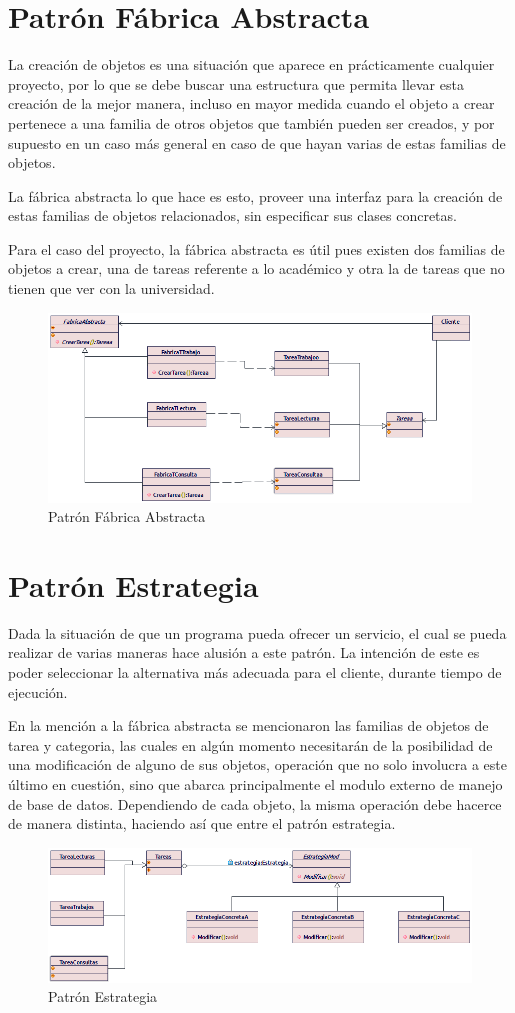 \section{Patrón Fábrica Abstracta}
La creación de objetos es una situación que aparece en prácticamente cualquier proyecto, por lo que se debe buscar una estructura que permita llevar esta creación de la mejor manera, incluso en mayor medida cuando el objeto a crear pertenece a una familia de otros objetos que también pueden ser creados, y por supuesto en un caso más general en caso de que hayan varias de estas familias de objetos.

La fábrica abstracta lo que hace es esto, proveer una interfaz para la creación de estas familias de objetos relacionados, sin especificar sus clases concretas.

Para el caso del proyecto, la fábrica abstracta es útil pues existen dos familias de objetos a crear, una de tareas referente a lo académico y otra la de tareas que no tienen que ver con la universidad.

\begin{figure}[H]
	\centering
	\includegraphics[width=1\linewidth]{diseno/patrones/imgs/FabricaAbstracta}
	\caption{Patrón Fábrica Abstracta}
	\label{fig:gantt}
\end{figure}

\section{Patrón Estrategia}
Dada la situación de que un programa pueda ofrecer un servicio, el cual se pueda realizar de varias maneras hace alusión a este patrón. La intención de este es poder seleccionar la alternativa más adecuada para el cliente, durante tiempo de ejecución.

En la mención a la fábrica abstracta se mencionaron las familias de objetos de tarea y categoria, las cuales en algún momento necesitarán de la posibilidad de una modificación de alguno de sus objetos, operación que no solo involucra a este último en cuestión, sino que abarca principalmente el modulo externo de manejo de base de datos. Dependiendo de cada objeto, la misma operación debe hacerce de manera distinta, haciendo así que entre el patrón estrategia.

\begin{figure}[H]
	\centering
	\includegraphics[width=1\linewidth]{diseno/patrones/imgs/Estrategia}
	\caption{Patrón Estrategia}
	\label{fig:gantt}
\end{figure}
